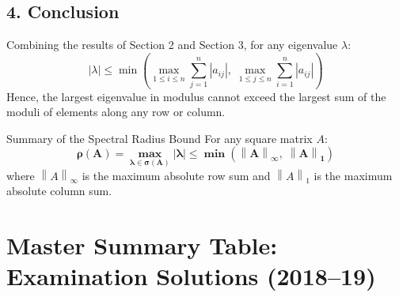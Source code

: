 \documentclass[11pt,a4paper]{article}
\newcommand{\abs}[1]{\left\lvert#1\right\rvert}
\newcommand{\norm}[1]{\left\lVert#1\right\rVert}
\begin{document}
\subsection*{4. Conclusion}
Combining the results of Section 2 and Section 3, for any eigenvalue $\lambda$:
\begin{equation}
\abs{\lambda} \le \min\left( \max_{1 \le i \le n} \sum_{j=1}^n \abs{a_{ij}}, \; \max_{1 \le j \le n} \sum_{i=1}^n \abs{a_{ij}} \right)
\end{equation}
Hence, the largest eigenvalue in modulus cannot exceed the largest sum of the moduli of elements along any row or column.

\begin{answerbox}{Summary of the Spectral Radius Bound}
For any square matrix $A$:
\begin{equation}
\mathbf{\rho(A) = \max_{\lambda \in \sigma(A)} \abs{\lambda} \le \min\left( \norm{A}_\infty, \; \norm{A}_1 \right)}
\end{equation}
where $\norm{A}_\infty$ is the maximum absolute row sum and $\norm{A}_1$ is the maximum absolute column sum.
\end{answerbox}

\newpage

\section*{Master Summary Table: Examination Solutions (2018--19)}
\end{document}
